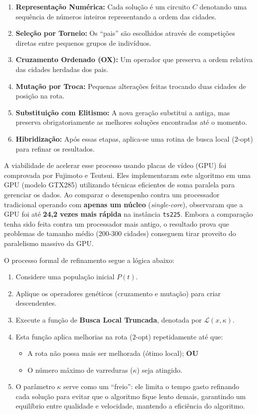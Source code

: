 \begin{enumerate}
\def\labelenumi{\arabic{enumi}.}
\tightlist
\item
  \textbf{Representação Numérica:} Cada solução é um circuito \(C\)
  denotando uma sequência de números inteiros representando a ordem das
  cidades.
\item
  \textbf{Seleção por Torneio:} Os ``pais'' são escolhidos através de
  competições diretas entre pequenos grupos de indivíduos.
\item
  \textbf{Cruzamento Ordenado (OX):} Um operador que preserva a ordem
  relativa das cidades herdadas dos pais.
\item
  \textbf{Mutação por Troca:} Pequenas alterações feitas trocando duas
  cidades de posição na rota.
\item
  \textbf{Substituição com Elitismo:} A nova geração substitui a antiga,
  mas preserva obrigatoriamente as melhores soluções encontradas até o
  momento.
\item
  \textbf{Hibridização:} Após essas etapas, aplica-se uma rotina de
  busca local (\(2\)-opt) para refinar os resultados.
\end{enumerate}

A viabilidade de acelerar esse processo usando placas de vídeo (GPU) foi
comprovada por Fujimoto e Tsutsui. Eles implementaram este algoritmo em
uma GPU (modelo GTX285) utilizando técnicas eficientes de soma paralela
para gerenciar os dados. Ao comparar o desempenho contra um processador
tradicional operando com \textbf{apenas um núcleo} (\emph{single-core}),
observaram que a GPU foi até \textbf{24,2 vezes mais rápida} na
instância \texttt{ts225}. Embora a comparação tenha sido feita contra um
processador mais antigo, o resultado prova que problemas de tamanho
médio (200-300 cidades) conseguem tirar proveito do paralelismo massivo
da GPU.

O processo formal de refinamento segue a lógica abaixo:

\begin{enumerate}
\def\labelenumi{\arabic{enumi}.}
\tightlist
\item
  Considere uma população inicial \(P(t)\).
\item
  Aplique os operadores genéticos (cruzamento e mutação) para criar
  descendentes.
\item
  Execute a função de \textbf{Busca Local Truncada}, denotada por
  \(\mathcal{L}(x, \kappa)\).
\item
  Esta função aplica melhorias na rota (\(2\)-opt) repetidamente até
  que:

  \begin{itemize}
  \tightlist
  \item
    A rota não possa mais ser melhorada (ótimo local); \textbf{OU}
  \item
    O número máximo de varreduras (\(\kappa\)) seja atingido.
  \end{itemize}
\item
  O parâmetro \(\kappa\) serve como um ``freio'': ele limita o tempo
  gasto refinando cada solução para evitar que o algoritmo fique lento
  demais, garantindo um equilíbrio entre qualidade e velocidade,
  mantendo a eficiência do algoritmo.
\end{enumerate}

